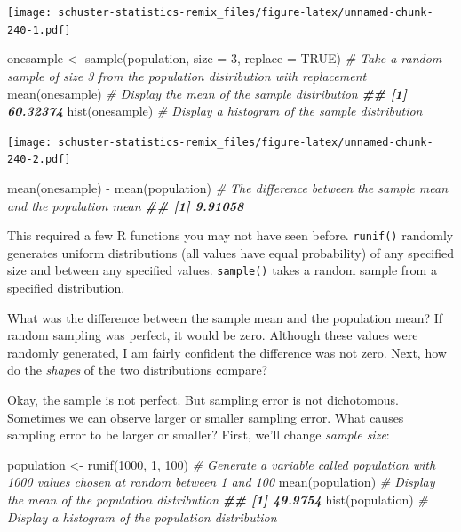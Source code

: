 \documentclass[
]{book}
\newenvironment{Shaded}{\begin{snugshade}}{\end{snugshade}}
\newcommand{\AttributeTok}[1]{\textcolor[rgb]{0.77,0.63,0.00}{#1}}
\newcommand{\CommentTok}[1]{\textcolor[rgb]{0.56,0.35,0.01}{\textit{#1}}}
\newcommand{\ConstantTok}[1]{\textcolor[rgb]{0.00,0.00,0.00}{#1}}
\newcommand{\DecValTok}[1]{\textcolor[rgb]{0.00,0.00,0.81}{#1}}
\newcommand{\DocumentationTok}[1]{\textcolor[rgb]{0.56,0.35,0.01}{\textbf{\textit{#1}}}}
\newcommand{\FunctionTok}[1]{\textcolor[rgb]{0.00,0.00,0.00}{#1}}
\newcommand{\NormalTok}[1]{#1}
\newcommand{\OtherTok}[1]{\textcolor[rgb]{0.56,0.35,0.01}{#1}}
\newcommand{\SpecialCharTok}[1]{\textcolor[rgb]{0.00,0.00,0.00}{#1}}
\begin{document}
\texttt{[image: schuster-statistics-remix\_files/figure-latex/unnamed-chunk-240-1.pdf]}

\begin{Shaded}
\begin{Highlighting}[]
\NormalTok{onesample }\OtherTok{\textless{}{-}} \FunctionTok{sample}\NormalTok{(population, }\AttributeTok{size =} \DecValTok{3}\NormalTok{, }\AttributeTok{replace =} \ConstantTok{TRUE}\NormalTok{) }\CommentTok{\# Take a random sample of size 3 from the population distribution with replacement}
\FunctionTok{mean}\NormalTok{(onesample) }\CommentTok{\# Display the mean of the sample distribution}
\DocumentationTok{\#\# [1] 60.32374}
\FunctionTok{hist}\NormalTok{(onesample) }\CommentTok{\# Display a histogram of the sample distribution}
\end{Highlighting}
\end{Shaded}

\texttt{[image: schuster-statistics-remix\_files/figure-latex/unnamed-chunk-240-2.pdf]}

\begin{Shaded}
\begin{Highlighting}[]
\FunctionTok{mean}\NormalTok{(onesample) }\SpecialCharTok{{-}} \FunctionTok{mean}\NormalTok{(population) }\CommentTok{\# The difference between the sample mean and the population mean}
\DocumentationTok{\#\# [1] 9.91058}
\end{Highlighting}
\end{Shaded}

This required a few R functions you may not have seen before. \texttt{runif()} randomly generates uniform distributions (all values have equal probability) of any specified size and between any specified values. \texttt{sample()} takes a random sample from a specified distribution.

What was the difference between the sample mean and the population mean? If random sampling was perfect, it would be zero. Although these values were randomly generated, I am fairly confident the difference was not zero. Next, how do the \emph{shapes} of the two distributions compare?

Okay, the sample is not perfect. But sampling error is not dichotomous. Sometimes we can observe larger or smaller sampling error. What causes sampling error to be larger or smaller? First, we'll change \emph{sample size}:

\begin{Shaded}
\begin{Highlighting}[]
\NormalTok{population }\OtherTok{\textless{}{-}} \FunctionTok{runif}\NormalTok{(}\DecValTok{1000}\NormalTok{, }\DecValTok{1}\NormalTok{, }\DecValTok{100}\NormalTok{) }\CommentTok{\# Generate a variable called \textquotesingle{}population\textquotesingle{} with 1000 values chosen at random between 1 and 100}
\FunctionTok{mean}\NormalTok{(population) }\CommentTok{\# Display the mean of the population distribution}
\DocumentationTok{\#\# [1] 49.9754}
\FunctionTok{hist}\NormalTok{(population) }\CommentTok{\# Display a histogram of the population distribution}
\end{Highlighting}
\end{Shaded}
\end{document}
